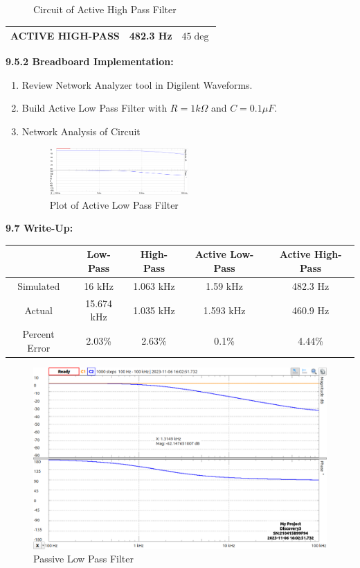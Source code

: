 \documentclass{article}
\begin{document}
\begin{enumerate}
\begin{figure}[H]
        \caption{Circuit of Active High Pass Filter}
    \end{figure}
    \begin{tabular}{|c|c|c|}
        \hline
        ACTIVE HIGH-PASS & 482.3 Hz & $45\deg$ \\
        \hline
        \end{tabular}
\end{enumerate}
\textbf{9.5.2 Breadboard Implementation:}
\begin{enumerate}
    \item Review Network Analyzer tool in Digilent Waveforms.
    \item Build Active Low Pass Filter with $R = 1k \Omega$ and $C = 0.1 \mu F$.
    \item Network Analysis of Circuit
    \begin{figure}[H]
        \centering
        \includegraphics[width=0.5\textwidth]{3physPlot.png}
        \caption{Plot of Active Low Pass Filter}
    \end{figure}
\end{enumerate}

\textbf{\large 9.7 Write-Up:}

\begin{tabular}{|c|c|c|c|c|}
    \hline
    & Low-Pass & High-Pass & Active Low-Pass & Active High-Pass\\
    \hline
    Simulated & 16 kHz & 1.063 kHz & 1.59 kHz & 482.3 Hz \\
    \hline
    Actual & 15.674 kHz & 1.035 kHz & 1.593 kHz & 460.9 Hz \\
    \hline 
    Percent Error & 2.03\% & 2.63\% & 0.1\% & 4.44\% \\
    \hline
\end{tabular}

\begin{figure}[H]
    \centering
    \includegraphics[width=1\textwidth]{1inlab.png}
    \caption{Passive Low Pass Filter}
\end{figure}
\end{document}
